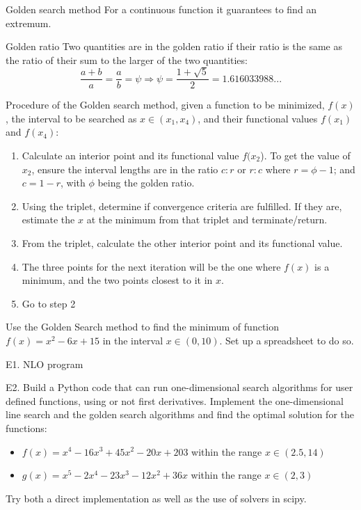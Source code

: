\documentclass[c]{beamer}
\begin{document}
\begin{frame}[allowframebreaks]{Golden search method}
For a continuous function it guarantees to find an extremum.

\begin{block}{Golden ratio}
   Two quantities are in the golden ratio if their ratio is the same as the ratio of their sum to the larger of the two quantities:
\[
\frac{a+b}{a}=\frac{a}{b}=\psi \Rightarrow \psi=\frac{1+\sqrt{5}}{2}=1.616033988...
\]
\end{block}

Procedure of the Golden search method, given a function  to be minimized, $f(x)$, the interval to be searched as $x\in(x_1,x_4)$, and their functional values $f(x_1)$ and $f(x_4)$:
\begin{enumerate}
  \item Calculate an interior point and its functional value $f(x_2$). To get the value of $x_2$, ensure the interval lengths are in the ratio $c : r$ or $r : c$ where $r = \phi − 1$; and $c = 1 − r$, with $\phi$ being the golden ratio.
  \item Using the triplet, determine if convergence criteria are fulfilled. If they are, estimate the $x$ at the minimum from that triplet and terminate/return.
  \item From the triplet, calculate the other interior point and its functional value.
  \item The three points for the next iteration will be the one where $f(x)$ is a minimum, and the two points closest to it in $x$.
  \item Go to step 2
\end{enumerate}

\begin{Exercise}
  Use the Golden Search method to find the minimum of function $f(x)=x^2-6x+15$ in the interval $x\in(0,10)$. Set up a spreadsheet to do so.
\end{Exercise}

\end{frame}

\begin{frame}[t]{E1. NLO program}
\begin{program}
  E2. Build a Python code that can run one-dimensional search algorithms for user defined functions, using or not first derivatives. Implement the one-dimensional line search and the golden search algorithms and find the optimal solution for the functions:
  \begin{itemize}
    \item $f(x)=x^4-16x^3+45 x^2-20x+203$ within the range $x\in(2.5,14)$
    \item $g(x)=x^5-2x^4-23x^3-12x^2+36x$ within the range $x\in(2,3)$
  \end{itemize}
  Try both a direct implementation as well as the use of solvers in scipy.
\end{program}
\end{frame}
\end{document}
